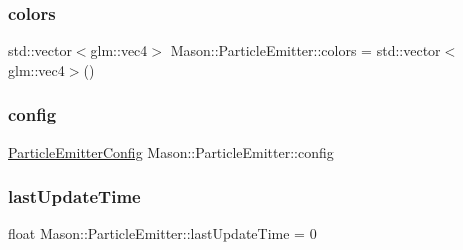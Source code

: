 \hypertarget{class_mason_1_1_particle_emitter_a18c989ce7de75ba90f2b9f40f36beed1}{}\label{class_mason_1_1_particle_emitter_a18c989ce7de75ba90f2b9f40f36beed1} 
\subsubsection{\texorpdfstring{colors}{colors}}
{\footnotesize\ttfamily std\+::vector$<$glm\+::vec4$>$ Mason\+::\+Particle\+Emitter\+::colors = std\+::vector$<$glm\+::vec4$>$()\hspace{0.3cm}{\ttfamily [protected]}}

\hypertarget{class_mason_1_1_particle_emitter_a86af1c5bfa7b301f334473b458d16ba0}{}\label{class_mason_1_1_particle_emitter_a86af1c5bfa7b301f334473b458d16ba0} 
\subsubsection{\texorpdfstring{config}{config}}
{\footnotesize\ttfamily \hyperlink{struct_mason_1_1_particle_emitter_config}{Particle\+Emitter\+Config} Mason\+::\+Particle\+Emitter\+::config\hspace{0.3cm}{\ttfamily [protected]}}

\hypertarget{class_mason_1_1_particle_emitter_a79acae3c8f64f592e8868cb166b1a1ce}{}\label{class_mason_1_1_particle_emitter_a79acae3c8f64f592e8868cb166b1a1ce} 
\subsubsection{\texorpdfstring{last\+Update\+Time}{lastUpdateTime}}
{\footnotesize\ttfamily float Mason\+::\+Particle\+Emitter\+::last\+Update\+Time = 0\hspace{0.3cm}{\ttfamily [protected]}}

\hypertarget{class_mason_1_1_particle_emitter_a591a7ed2fc6cded5dc19b144ece7b3fb}{}\label{class_mason_1_1_particle_emitter_a591a7ed2fc6cded5dc19b144ece7b3fb} 
